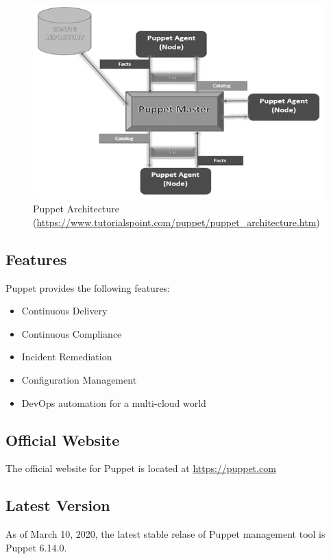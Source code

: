 \documentclass[a4paper, 12pt]{article}
\begin{document}
\begin{figure}[H]
	\centering
	\includegraphics[width=\linewidth]{img/puppet_arch.jpg}
  	\caption{Puppet Architecture (\href{https://www.tutorialspoint.com/puppet/puppet\_architecture.htm}{https://www.tutorialspoint.com/puppet/puppet\_architecture.htm})}
	\label{fig:puppet_arch}
\end{figure}


\subsection{Features}
Puppet provides the following features:
\begin{itemize}
\item
Continuous Delivery
\item
Continuous Compliance
\item
Incident Remediation
\item
Configuration Management
\item
DevOps automation for a multi-cloud world
\end{itemize}

\subsection{Official Website}
The official website for Puppet is located at \href{https://puppet.com}{https://puppet.com}

\subsection{Latest Version}
As of March 10, 2020, the latest stable relase of Puppet management tool is Puppet 6.14.0.
\end{document}
